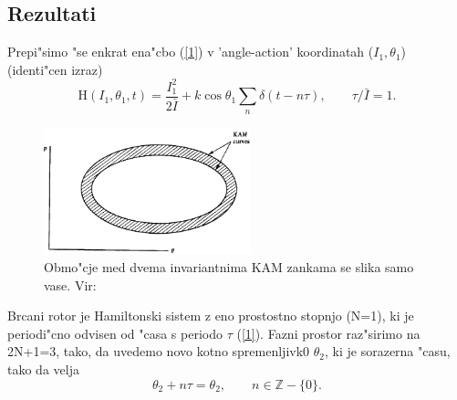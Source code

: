 \documentclass[]{article}
\begin{document}
\subsection{Rezultati}
Prepi"simo "se enkrat ena"cbo (\ref{1}) v 'angle-action' koordinatah ($I_1,\theta_1$) (identi"cen izraz)
\begin{equation}
\text{H}(I_1,\theta_1,t)=\frac{I_1^2}{2\bar{I}}+k\cos\theta_1\sum_n\delta(t-n\tau),\qquad \tau/\bar{I}=1.
\end{equation}
\begin{figure}
	\begin{center}
		\includegraphics[width = 6cm]{9}
		\caption{Obmo"cje med dvema invariantnima KAM zankama se slika samo vase. Vir: \cite{1}}
		\label{slika 10}
	\end{center}
\end{figure}
Brcani rotor je Hamiltonski sistem z eno prostostno stopnjo (N=1), ki je periodi"cno odvisen od "casa s periodo $\tau$ (\ref{1}). Fazni prostor raz"sirimo na 2N+1=3, tako, da uvedemo novo kotno spremenljivk0 $\theta_2$, ki je sorazerna "casu, tako da velja
\begin{equation}
\theta_2+n\tau=\theta_2,\qquad n\in\mathbb{Z}-\{0\}.
\end{equation}
\end{document}
